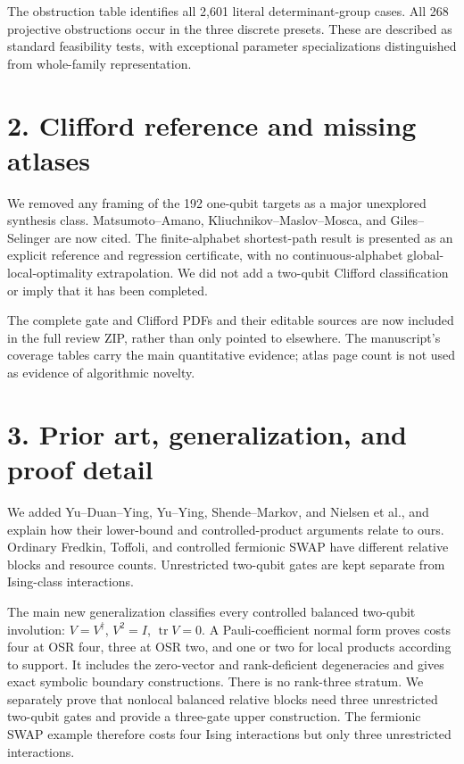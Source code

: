 \documentclass[11pt]{article}
\begin{document}
The obstruction table identifies all 2,601 literal determinant-group cases.
All 268 projective obstructions occur in the three discrete presets. These
are described as standard feasibility tests, with exceptional parameter
specializations distinguished from whole-family representation.

\section*{2. Clifford reference and missing atlases}
We removed any framing of the 192 one-qubit targets as a major unexplored
synthesis class. Matsumoto--Amano, Kliuchnikov--Maslov--Mosca, and
Giles--Selinger are now cited. The finite-alphabet shortest-path result is
presented as an explicit reference and regression certificate, with no
continuous-alphabet global-local-optimality extrapolation. We did not add a
two-qubit Clifford classification or imply that it has been completed.

The complete gate and Clifford PDFs and their editable sources are now
included in the full review ZIP, rather than only pointed to elsewhere.
The manuscript's coverage tables carry the main quantitative evidence;
atlas page count is not used as evidence of algorithmic novelty.

\section*{3. Prior art, generalization, and proof detail}
We added Yu--Duan--Ying, Yu--Ying, Shende--Markov, and Nielsen et al., and
explain how their lower-bound and controlled-product arguments relate to
ours. Ordinary Fredkin, Toffoli, and controlled fermionic SWAP have different
relative blocks and resource counts. Unrestricted two-qubit gates are kept
separate from Ising-class interactions.

The main new generalization classifies every controlled balanced two-qubit
involution: $V=V^\dagger$, $V^2=I$, $\operatorname{tr}V=0$. A Pauli-coefficient
normal form proves costs four at OSR four, three at OSR two, and one or two
for local products according to support. It includes the zero-vector and
rank-deficient degeneracies and gives exact symbolic boundary constructions.
There is no rank-three stratum. We separately prove that nonlocal balanced
relative blocks need three unrestricted two-qubit gates and provide a
three-gate upper construction. The fermionic SWAP example therefore costs
four Ising interactions but only three unrestricted interactions.
\end{document}
